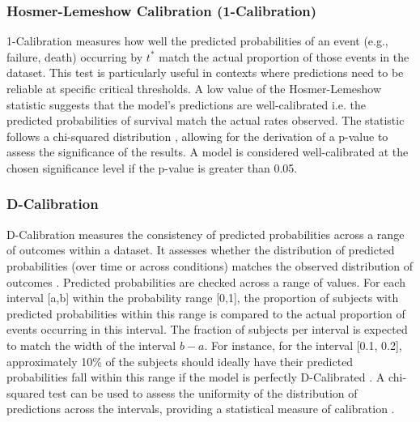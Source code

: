 \subsubsection{Hosmer-Lemeshow Calibration (1-Calibration)}
1-Calibration \parencite{haider_effective_2018} measures how well the predicted probabilities of an event (e.g., failure, death) occurring by \(t^{*}\) match the actual proportion of those events in the dataset. This test is particularly useful in contexts where predictions need to be reliable at specific critical thresholds. A low value of the Hosmer-Lemeshow statistic \parencite{qi_effective_2023} suggests that the model's predictions are well-calibrated i.e. the predicted probabilities of survival match the actual rates observed. The statistic follows a chi-squared distribution \parencite{qi_effective_2023}, allowing for the derivation of a p-value to assess the significance of the results. A model is considered well-calibrated at the chosen significance level if the p-value is greater than 0.05.

\subsubsection{D-Calibration}
D-Calibration measures the consistency of predicted probabilities across a range of outcomes within a dataset. It assesses whether the distribution of predicted probabilities (over time or across conditions) matches the observed distribution of outcomes \parencite{haider_effective_2018}. Predicted probabilities are checked across a range of values. For each interval [a,b] within the probability range [0,1], the proportion of subjects with predicted probabilities within this range is compared to the actual proportion of events occurring in this interval. The fraction of subjects per interval is expected to match the width of the interval \(b-a\). For instance, for the interval [0.1, 0.2], approximately 10\% of the subjects should ideally have their predicted probabilities fall within this range if the model is perfectly D-Calibrated \parencite{haider_effective_2018}. A chi-squared test can be used to assess the uniformity of the distribution of predictions across the intervals, providing a statistical measure of calibration \parencite{haider_effective_2018}.


